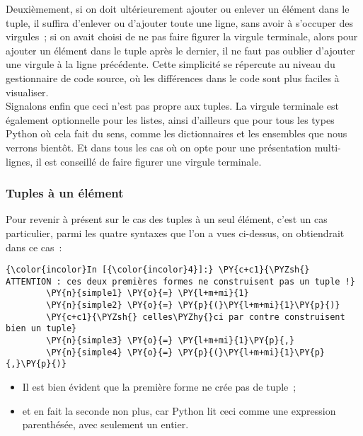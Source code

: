 Deuxièmement, si on doit ultérieurement ajouter ou enlever un élément
dans le tuple, il suffira d'enlever ou d'ajouter toute une ligne, sans
avoir à s'occuper des virgules~; si on avait choisi de ne pas faire
figurer la virgule terminale, alors pour ajouter un élément dans le
tuple après le dernier, il ne faut pas oublier d'ajouter une virgule à
la ligne précédente. Cette simplicité se répercute au niveau du
gestionnaire de code source, où les différences dans le code sont plus
faciles à visualiser.\\

Signalons enfin que ceci n'est pas propre aux tuples. La virgule
terminale est également optionnelle pour les listes, ainsi d'ailleurs
que pour tous les types Python où cela fait du sens, comme les
dictionnaires et les ensembles que nous verrons bientôt. Et dans tous
les cas où on opte pour une présentation multi-lignes, il est conseillé
de faire figurer une virgule terminale.

    \hypertarget{tuples-uxe0-un-uxe9luxe9ment}{%
\subsubsection{Tuples à un élément}\label{tuples-uxe0-un-uxe9luxe9ment}}

    Pour revenir à présent sur le cas des tuples à un seul élément, c'est un
cas particulier, parmi les quatre syntaxes que l'on a vues ci-dessus, on
obtiendrait dans ce cas~:

    \begin{Verbatim}[commandchars=\\\{\}]
{\color{incolor}In [{\color{incolor}4}]:} \PY{c+c1}{\PYZsh{} ATTENTION : ces deux premières formes ne construisent pas un tuple !}
        \PY{n}{simple1} \PY{o}{=} \PY{l+m+mi}{1}
        \PY{n}{simple2} \PY{o}{=} \PY{p}{(}\PY{l+m+mi}{1}\PY{p}{)}
        \PY{c+c1}{\PYZsh{} celles\PYZhy{}ci par contre construisent bien un tuple}
        \PY{n}{simple3} \PY{o}{=} \PY{l+m+mi}{1}\PY{p}{,}
        \PY{n}{simple4} \PY{o}{=} \PY{p}{(}\PY{l+m+mi}{1}\PY{p}{,}\PY{p}{)}
\end{Verbatim}


    \begin{itemize}
\tightlist
\item
  Il est bien évident que la première forme ne crée pas de tuple~;
\item
  et en fait la seconde non plus, car Python lit ceci comme une
  expression parenthésée, avec seulement un entier.
\end{itemize}

